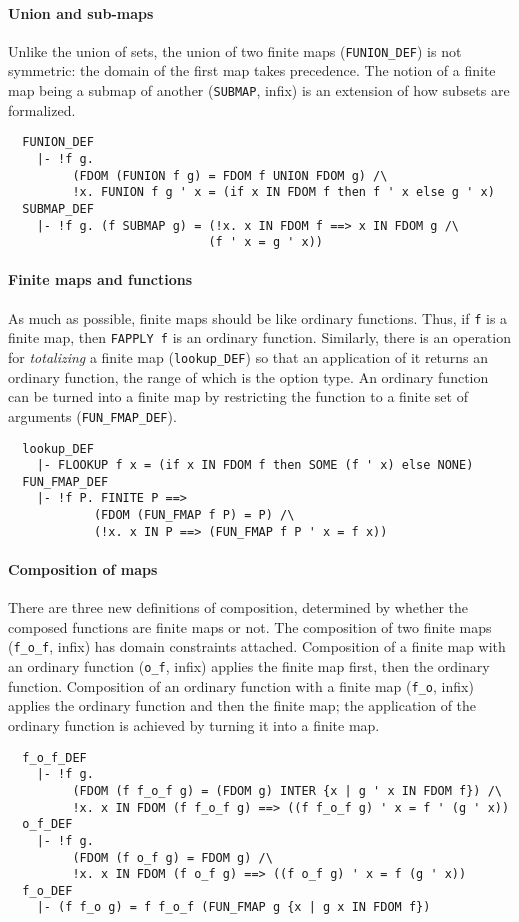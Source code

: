 \paragraph {Union and sub-maps}

Unlike the union of sets, the union of two finite maps
({\small\verb+FUNION_DEF+}) is not symmetric: the domain of the first
map takes precedence. The notion of a finite map being a submap of another
({\small\verb+SUBMAP+}, infix) is an extension of how subsets are formalized.
{\small
\begin{verbatim}
  FUNION_DEF
    |- !f g.
         (FDOM (FUNION f g) = FDOM f UNION FDOM g) /\
         !x. FUNION f g ' x = (if x IN FDOM f then f ' x else g ' x)
  SUBMAP_DEF
    |- !f g. (f SUBMAP g) = (!x. x IN FDOM f ==> x IN FDOM g /\
                            (f ' x = g ' x))
\end{verbatim}}

\paragraph {Finite maps and functions}

As much as possible, finite maps should be like ordinary functions.
Thus, if \verb+f+ is a finite map, then {\small\verb+FAPPLY f+} is an
ordinary function. Similarly, there is an operation for
\emph{totalizing} a finite map ({\small\verb+lookup_DEF+}) so that an
application of it returns an ordinary function, the range of which is
the option type.  An ordinary function can be turned into a finite map
by restricting the function to a finite set of arguments
({\small\verb+FUN_FMAP_DEF+}).
%
{\small
\begin{verbatim}
  lookup_DEF
    |- FLOOKUP f x = (if x IN FDOM f then SOME (f ' x) else NONE)
  FUN_FMAP_DEF
    |- !f P. FINITE P ==>
            (FDOM (FUN_FMAP f P) = P) /\
            (!x. x IN P ==> (FUN_FMAP f P ' x = f x))
\end{verbatim}}

\paragraph {Composition of maps}

There are three new definitions of composition, determined by whether
the composed functions are finite maps or not. The composition of two
finite maps (\verb+f_o_f+, infix) has domain constraints
attached. Composition of a finite map with an ordinary function
(\verb+o_f+, infix) applies the finite map first, then the ordinary
function.  Composition of an ordinary function with a finite map
(\verb+f_o+, infix) applies the ordinary function and then the finite
map; the application of the ordinary function is achieved by turning
it into a finite map.
%
{\small
\begin{verbatim}
  f_o_f_DEF
    |- !f g.
         (FDOM (f f_o_f g) = (FDOM g) INTER {x | g ' x IN FDOM f}) /\
         !x. x IN FDOM (f f_o_f g) ==> ((f f_o_f g) ' x = f ' (g ' x))
  o_f_DEF
    |- !f g.
         (FDOM (f o_f g) = FDOM g) /\
         !x. x IN FDOM (f o_f g) ==> ((f o_f g) ' x = f (g ' x))
  f_o_DEF
    |- (f f_o g) = f f_o_f (FUN_FMAP g {x | g x IN FDOM f})
\end{verbatim}}

